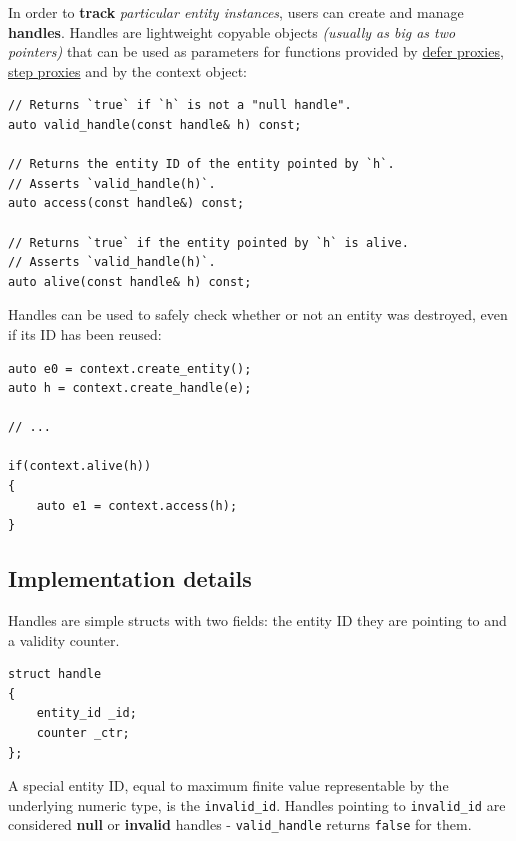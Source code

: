 \documentclass[twoside, 12pt, a4paper, openany]{book}
\begin{document}
In order to \textbf{track} \emph{particular entity instances}, users can
create and manage \textbf{handles}. Handles are lightweight copyable
objects \emph{(usually as big as two pointers)} that can be used as
parameters for functions provided by
\protect\hyperlink{proxies_defer}{defer proxies},
\protect\hyperlink{proxies_step}{step proxies} and by the context
object:

\begin{verbatim}
// Returns `true` if `h` is not a "null handle".
auto valid_handle(const handle& h) const;

// Returns the entity ID of the entity pointed by `h`.
// Asserts `valid_handle(h)`.
auto access(const handle&) const;

// Returns `true` if the entity pointed by `h` is alive.
// Asserts `valid_handle(h)`.
auto alive(const handle& h) const;
\end{verbatim}

Handles can be used to safely check whether or not an entity was
destroyed, even if its ID has been reused:

\begin{verbatim}
auto e0 = context.create_entity();
auto h = context.create_handle(e);

// ...

if(context.alive(h))
{
    auto e1 = context.access(h);
}
\end{verbatim}

\subsection{Implementation details}\label{implementation-details-3}

Handles are simple structs with two fields: the entity ID they are
pointing to and a validity counter.

\begin{verbatim}
struct handle
{
    entity_id _id;
    counter _ctr;
};
\end{verbatim}

A special entity ID, equal to maximum finite value representable by the
underlying numeric type, is the
\texttt{invalid_id}.
Handles pointing to
\texttt{invalid_id}
are considered \textbf{null} or \textbf{invalid} handles -
\texttt{valid_handle}
returns
\texttt{false}
for them.
\end{document}
